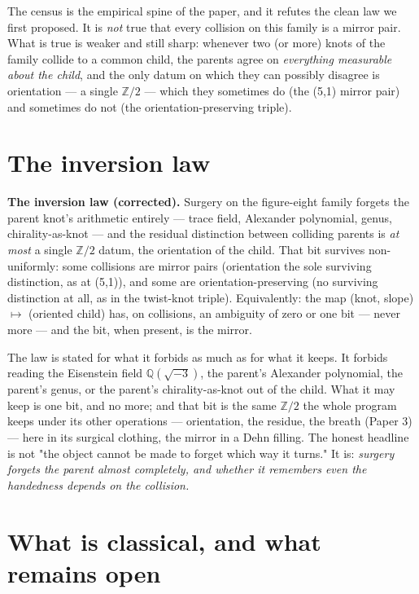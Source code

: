 \documentclass[11pt]{article}
\theoremstyle{plain}
\theoremstyle{definition}
\theoremstyle{remark}
\begin{document}
The census is the empirical spine of the paper, and it refutes the clean law we first proposed. It is \emph{not} true that every collision on this family is a mirror pair. What is true is weaker and still sharp: whenever two (or more) knots of the family collide to a common child, the parents agree on \emph{everything measurable about the child}, and the only datum on which they can possibly disagree is orientation — a single \(\mathbb{Z}/2\) — which they sometimes do (the (5,1) mirror pair) and sometimes do not (the orientation-preserving triple).

\section{The inversion law}

\textbf{The inversion law (corrected).} Surgery on the figure-eight family forgets the parent knot's arithmetic entirely — trace field, Alexander polynomial, genus, chirality-as-knot — and the residual distinction between colliding parents is \emph{at most} a single \(\mathbb{Z}/2\) datum, the orientation of the child. That bit survives non-uniformly: some collisions are mirror pairs (orientation the sole surviving distinction, as at (5,1)), and some are orientation-preserving (no surviving distinction at all, as in the twist-knot triple). Equivalently: the map (knot, slope) \(\mapsto \) (oriented child) has, on collisions, an ambiguity of zero or one bit — never more — and the bit, when present, is the mirror.

The law is stated for what it forbids as much as for what it keeps. It forbids reading the Eisenstein field \(\mathbb{Q}(\sqrt{-3})\), the parent's Alexander polynomial, the parent's genus, or the parent's chirality-as-knot out of the child. What it may keep is one bit, and no more; and that bit is the same \(\mathbb{Z}/2\) the whole program keeps under its other operations — orientation, the residue, the breath (Paper 3) — here in its surgical clothing, the mirror in a Dehn filling. The honest headline is not "the object cannot be made to forget which way it turns." It is: \emph{surgery forgets the parent almost completely, and whether it remembers even the handedness depends on the collision.}

\section{What is classical, and what remains open}
\end{document}
